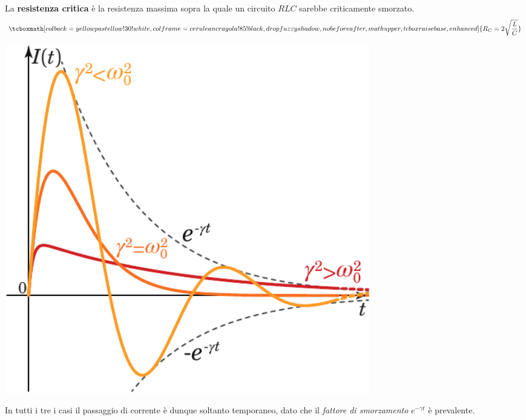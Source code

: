 \begin{define}
	La \textbf{resistenza critica} è la resistenza massima sopra la quale un circuito $RLC$ sarebbe criticamente smorzato.
	\begin{equation}
		\tcboxmath[colback=yellowpastellow!30!white,colframe=ceruleancrayola!85!black,drop fuzzy shadow, nobeforeafter, math upper, tcbox raise base, enhanced]{R_C=2\sqrt{\frac{L}{C}}}
	\end{equation}
\end{define}
\begin{center}
	\includegraphics[width=0.7\textwidth]{images/chp11/chp11RLCgraf.pdf}
\end{center}
In tutti i tre i casi il passaggio di corrente è dunque soltanto temporaneo, dato che il \textit{fattore di smorzamento} $e^{-\gamma t}$ è prevalente.

